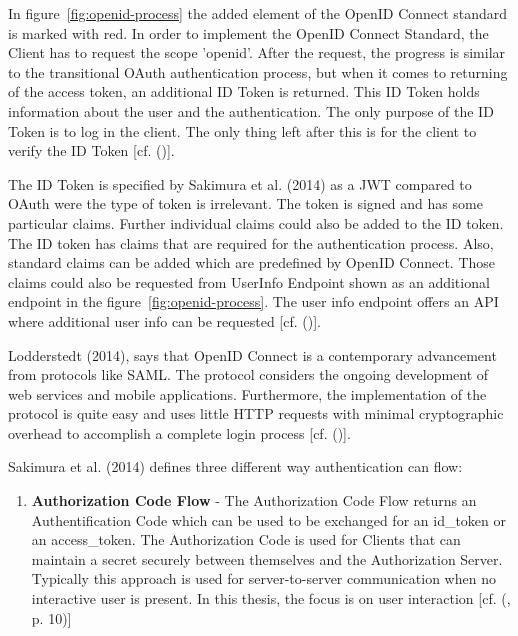 {{		
		In figure~\ref{fig:openid-process} the added element of the OpenID Connect standard is marked with red. In order to implement the OpenID Connect Standard, the Client has to request the scope 'openid'. After the request, the progress is similar to the transitional OAuth authentication process, but when it comes to returning of the access token, an additional ID Token is returned. This ID Token holds information about the user and the authentication. The only purpose of the ID Token is to log in the client. The only thing left after this is for the client to verify the ID Token [cf. (\cite{Lodderstedt:2014:OpenID})]. 
		
		The ID Token is specified by Sakimura et al. (2014) as a JWT compared to OAuth were the type of token is irrelevant. The token is signed and has some particular claims. Further individual claims could also be added to the ID token. The ID token has claims that are required for the authentication process. Also, standard claims can be added which are predefined by OpenID Connect. Those claims could also be requested from UserInfo Endpoint shown as an additional endpoint in the figure~\ref{fig:openid-process}. The user info endpoint offers an API where additional user info can be requested [cf. (\cite{Sakimura:2014:OpenIDConnect})].
		
		Lodderstedt (2014), says that OpenID Connect is a contemporary advancement from protocols like SAML. The protocol considers the ongoing development of web services and mobile applications. Furthermore, the implementation of the protocol is quite easy and uses little HTTP requests with minimal cryptographic overhead to accomplish a complete login process [cf. (\cite{Lodderstedt:2014:OpenID})]. 
		
		
		
		
		
		
		Sakimura et al. (2014) defines three different way authentication can flow:
		
		
		\begin{enumerate}
			\item \textbf{Authorization Code Flow}  - The Authorization Code Flow returns an Authentification Code which can be used to be exchanged for an id\_token or an access\_token. The Authorization Code is used for Clients that can maintain a secret securely between themselves and the Authorization Server. Typically this approach is used for server-to-server communication when no interactive user is present. In this thesis, the focus is on user interaction [cf. (\cite{Sakimura:2014:OpenIDConnect}, p. 10)]
			

\end{enumerate}}}

